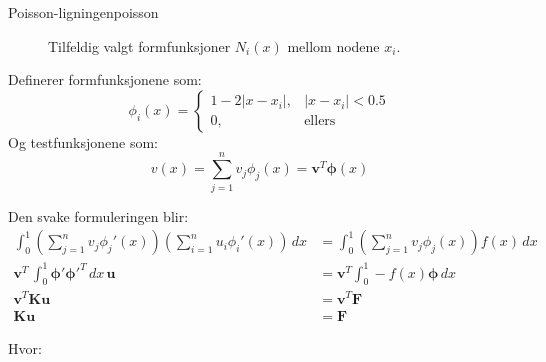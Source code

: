 \begin{example}{Poisson-ligningen}{poisson}
\begin{figure}[H]
    \caption{Tilfeldig valgt formfunksjoner \(N_i(x)\) mellom nodene \(x_i\).}
  \end{figure}
  Definerer formfunksjonene som:
  \[
    \phi_i(x) = \begin{cases}
      1 - 2|x - x_i|, & |x - x_i| < 0.5 \\
      0,              & \text{ellers}
    \end{cases}
  \]
  Og testfunksjonene som:
  \[
    v(x) = \sum_{j=1}^n v_j \phi_j(x) = \symbf{v}^T \symbf{\phi}(x)
  \]

  Den svake formuleringen blir:
  \begin{align*}
    \int_0^1 \left( \sum_{j=1}^n v_j \phi_j'(x) \right)
    \left( \sum_{i=1}^n u_i \phi_i'(x) \right) \, dx
                        & =
    \int_0^1 \left( \sum_{j=1}^n v_j \phi_j(x) \right) f(x) \, dx \\
    \symbf{v}^T \, \int_0^1 \symbf{\phi}' \symbf{\phi}'^T \, dx \, \symbf{u}
                        & =
    \symbf{v}^T \int_0^1 - f(x) \symbf{\phi}  \, dx               \\
    \symbf{v}^T \symbf{K} \symbf{u}
                        & =
    \symbf{v}^T \symbf{F}                                         \\
    \symbf{K} \symbf{u} & = \symbf{F}
  \end{align*}

  Hvor:


\end{example}
